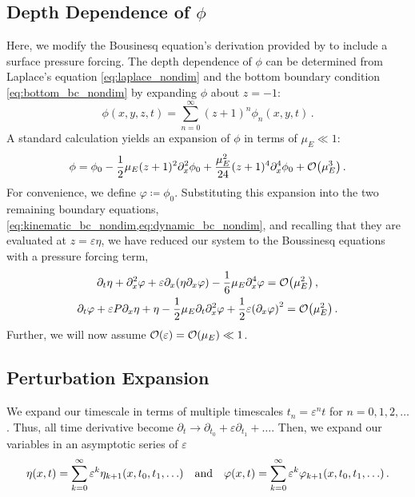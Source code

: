 \documentclass{jfm}
\renewcommand*{\epsilon}{\varepsilon}
\begin{document}
\subsection{Depth Dependence of \texorpdfstring{$\phi$}{Velocity Potential}}
Here, we modify the Bousinesq equation's derivation provided by
\citet{mei2005nonlinear} to include a surface pressure forcing.
The depth dependence of $\phi$ can be determined from Laplace's equation
\cref{eq:laplace_nondim} and the bottom boundary condition
\cref{eq:bottom_bc_nondim} by expanding $\phi$ about $z=-1$:
\begin{equation}
  \phi(x,y,z,t) = \sum_{n=0}^\infty (z+1)^n\phi_n(x,y,t) \,.
\end{equation}
A standard calculation \citep[\eg][]{mei2005nonlinear} yields an
expansion of $\phi$ in terms of $\mu_E \ll 1$:
\begin{equation}
  \phi = \phi_0 - \frac{1}{2}\mu_E (z+1)^2\partial^2_x\phi_0 +
  \frac{\mu_E^2}{24}(z+1)^4\partial^4_x\phi_0 +
  \order{\mu_E^3} \,.
\end{equation}
For convenience, we define $\varphi \coloneqq \phi_0$.
Substituting this expansion into the two remaining boundary equations,
\cref{eq:kinematic_bc_nondim,eq:dynamic_bc_nondim}, and recalling that
they are evaluated at $z=\epsilon \eta$, we have reduced our system to
the Boussinesq equations with a pressure forcing term,
\begin{gather}
  \partial_t \eta + \partial_x^2 \varphi + \epsilon \partial_x
    \pqty{\eta \partial_x \varphi} -\frac{1}{6}\mu_E \partial^4_x
    \varphi = \order{\mu_E^2} \label{eq:kinematic_bc_varphi} \,, \\
  \partial_t \varphi + \epsilon P \partial_x \eta + \eta -
    \frac{1}{2}\mu_E \partial_t \partial_x^2 \varphi +
    \frac{1}{2}\epsilon\pqty{\partial_x \varphi}^2 = \order{\mu_E^2} \,.
    \label{eq:dynamic_bc_varphi}
\end{gather}
Further, we will now assume $\order{\epsilon} = \order{\mu_E} \ll 1$.

\subsection{Perturbation Expansion}
\label{sec:shallow_water}
We expand our timescale in terms of multiple timescales $t_n =
\epsilon^n t$ for $n= 0,1,2,\ldots$.
Thus, all time derivative become $\partial_t \to \partial_{t_0} +
\epsilon \partial_{t_1} + \ldots$.
Then, we expand our variables in an asymptotic series of $\epsilon$
\begin{equation}
  \eta(x,t) = \sum_{k=0}^{\infty} \epsilon^k
    \eta_{k+1}(x,t_0,t_1,\ldots) \qq{and}
  \varphi(x,t) = \sum_{k=0}^{\infty} \epsilon^k
    \varphi_{k+1}(x,t_0,t_1,\ldots) \,.
\end{equation}
\end{document}
